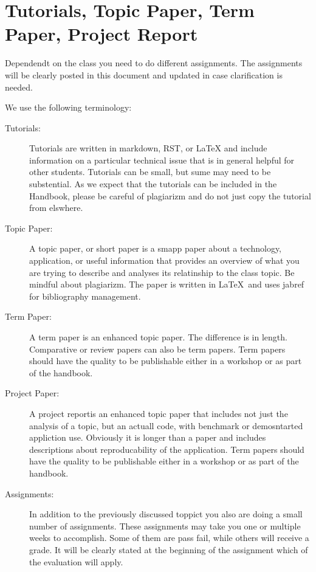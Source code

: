 
\section{Tutorials, Topic Paper, Term Paper, Project Report}

\FILENAME

Dependendt on the class you need to do different assignments. The
assignments will be clearly posted in this document and updated in
case clarification is needed. 

We use the following terminology:

\begin{description}

\item[Tutorials:] Tutorials are written in markdown, RST, or LaTeX and
  include information on a particular technical issue that is in
  general helpful for other students. Tutorials can be small, but sume
  may need to be substential. As we expect that the tutorials can be
  included in the Handbook, please be careful of plagiarizm and do not
  just copy the tutorial from elswhere. 

\item[Topic Paper:] A topic paper, or short paper is a smapp paper
  about a technology, application, or useful information that provides
  an overview of what you are trying to describe and analyses its
  relatinship to the class topic. Be mindful about plagiarizm. The
  paper is written in \LaTeX~and uses jabref for bibliography management.

\item[Term Paper:] A term paper is an enhanced topic paper. The
  difference is in length. Comparative or review papers can also be
  term papers.  Term papers should have the quality to be publishable
  either in a workshop or as part of the handbook.

\item[Project Paper:] A project reportis an enhanced topic paper that
  includes not just the analysis of a topic, but an actuall code, with
  benchmark or demosntarted appliction use. Obviously it is longer
  than a paper and includes descriptions about reproducability of the
  application. Term papers should have the quality to be publishable
  either in a workshop or as part of the handbook.

\item[Assignments:] In addition to the previously discussed toppict
  you also are doing a small number of assignments. These assignments
  may take you one or multiple weeks to accomplish. Some of them are
  pass fail, while others will receive a grade. It will be clearly
  stated at the beginning of the assignment which of the evaluation
  will apply.

\end{description}

